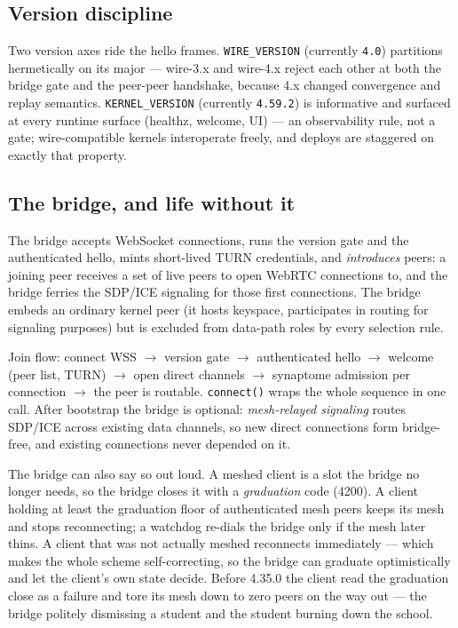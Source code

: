 \documentclass[nobib]{tufte-handout}
\begin{document}
\subsection{Version discipline}

Two version axes ride the hello frames. \texttt{WIRE\_VERSION} (currently
\texttt{4.0}) partitions hermetically on its major --- wire-3.x and
wire-4.x reject each other at both the bridge gate and the peer-peer
handshake, because 4.x changed convergence and replay semantics.
\texttt{KERNEL\_VERSION} (currently \texttt{4.59.2}) is informative and
surfaced at every runtime surface (healthz, welcome, UI) --- an
observability rule, not a gate; wire-compatible kernels interoperate
freely, and deploys are staggered on exactly that property.

\subsection{The bridge, and life without it}

The bridge accepts WebSocket connections, runs the version gate and the
authenticated hello, mints short-lived TURN credentials, and
\emph{introduces} peers: a joining peer receives a set of live peers to
open WebRTC connections to, and the bridge ferries the SDP/ICE signaling
for those first connections. The bridge embeds an ordinary kernel peer
(it hosts keyspace, participates in routing for signaling purposes) but
is excluded from data-path roles by every selection rule.

Join flow: connect WSS $\rightarrow$ version gate $\rightarrow$
authenticated hello $\rightarrow$ welcome (peer list, TURN) $\rightarrow$
open direct channels $\rightarrow$ synaptome admission per connection
$\rightarrow$ the peer is routable. \texttt{connect()} wraps the whole
sequence in one call. After bootstrap the bridge is optional:
\emph{mesh-relayed signaling} routes SDP/ICE across existing data
channels, so new direct connections form bridge-free, and existing
connections never depended on it.

The bridge can also say so out loud. A meshed client is a slot the
bridge no longer needs, so the bridge closes it with a
\emph{graduation} code (4200). A client holding at least the
graduation floor of authenticated mesh peers keeps its mesh and stops
reconnecting; a watchdog re-dials the bridge only if the mesh later
thins. A client that was not actually meshed reconnects immediately ---
which makes the whole scheme self-correcting, so the bridge can
graduate optimistically and let the client's own state decide. Before
4.35.0 the client read the graduation close as a failure and tore its
mesh down to zero peers on the way out --- the bridge politely
dismissing a student and the student burning down the school.
\end{document}
